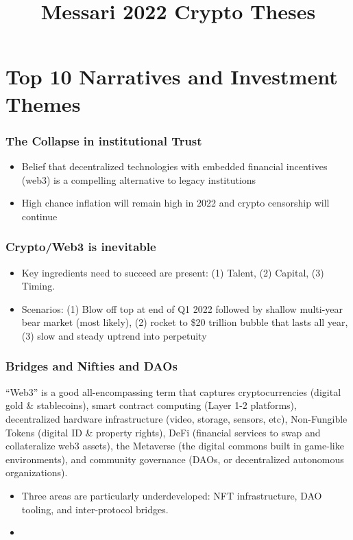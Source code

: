 \documentclass{../notes}
\title{Messari 2022 Crypto Theses}
\begin{document}
\maketitle

\part{Top 10 Narratives and Investment Themes}
\section{The Collapse in institutional Trust}
\begin{itemize}
    \item Belief that decentralized technologies with embedded financial incentives (web3) is a compelling alternative to legacy institutions
    \item High chance inflation will remain high in 2022 and crypto censorship will continue
\end{itemize}
\section{Crypto/Web3 is inevitable}
\begin{itemize}
    \item Key ingredients need to succeed are present: (1) Talent, (2) Capital, (3) Timing. 
    \item Scenarios: (1) Blow off top at end of Q1 2022 followed by shallow multi-year bear market (most likely), (2) rocket to \$20 trillion bubble that lasts all year, (3) slow and steady uptrend into perpetuity
\end{itemize}
\section{Bridges and Nifties and DAOs}
“Web3” is a good all-encompassing term that captures cryptocurrencies (digital gold \& stablecoins), smart contract computing (Layer 1-2 platforms), decentralized hardware infrastructure (video, storage, sensors, etc), Non-Fungible Tokens (digital ID \& property rights), DeFi (financial services to swap and collateralize web3 assets), the Metaverse (the digital commons built in game-like environments), and community governance (DAOs, or decentralized autonomous organizations).
\begin{itemize}
    \item Three areas are particularly underdeveloped: NFT infrastructure, DAO tooling, and inter-protocol bridges.
    \item 
\end{itemize}
\end{document}
